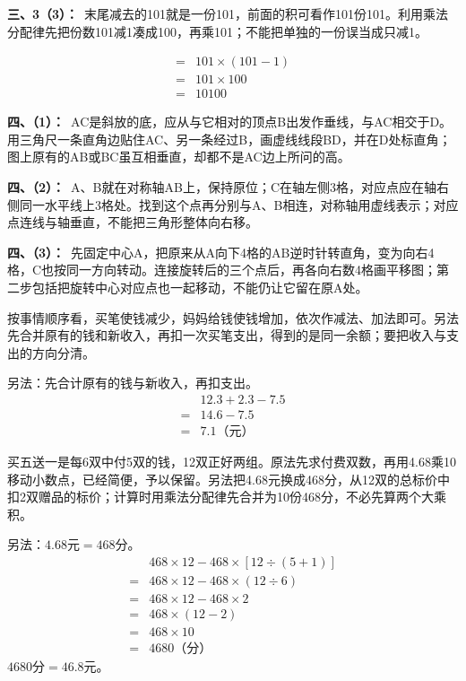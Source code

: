 \documentclass[multi=snippet,border=0pt]{standalone}
\newenvironment{snippet}[3]{\begin{minipage}{#1bp}\color{answerred}\fontsize{#2}{#3}\selectfont\raggedright}{\end{minipage}}
\begin{document}
\begin{snippet}{505}{11.5}{14}\textbf{三、3（3）：}\ 末尾减去的101就是一份101，前面的积可看作101份101。利用乘法分配律先把份数101减1凑成100，再乘101；不能把单独的一份误当成只减1。\end{snippet}
\begin{snippet}{184.567}{10.5}{12.8}\[\begin{aligned}={}&101\times(101-1)\\={}&101\times100\\={}&10100\end{aligned}\]\end{snippet}
\begin{snippet}{505}{11.5}{14}\textbf{四、（1）：}\ AC是斜放的底，应从与它相对的顶点B出发作垂线，与AC相交于D。用三角尺一条直角边贴住AC、另一条经过B，画虚线线段BD，并在D处标直角；图上原有的AB或BC虽互相垂直，却都不是AC边上所问的高。\end{snippet}
\begin{snippet}{505}{11.5}{14}\textbf{四、（2）：}\ A、B就在对称轴AB上，保持原位；C在轴左侧3格，对应点应在轴右侧同一水平线上3格处。找到这个点再分别与A、B相连，对称轴用虚线表示；对应点连线与轴垂直，不能把三角形整体向右移。\end{snippet}
\begin{snippet}{505}{11.5}{14}\textbf{四、（3）：}\ 先固定中心A，把原来从A向下4格的AB逆时针转直角，变为向右4格，C也按同一方向转动。连接旋转后的三个点后，再各向右数4格画平移图；第二步包括把旋转中心对应点也一起移动，不能仍让它留在原A处。\end{snippet}
\begin{snippet}{505}{11.5}{14}按事情顺序看，买笔使钱减少，妈妈给钱使钱增加，依次作减法、加法即可。另法先合并原有的钱和新收入，再扣一次买笔支出，得到的是同一余额；要把收入与支出的方向分清。\par 另法：先合计原有的钱与新收入，再扣支出。\[\begin{aligned} &12.3+2.3-7.5\\={}&14.6-7.5\\={}&7.1\text{（元）}\end{aligned}\]\end{snippet}
\begin{snippet}{505}{11.5}{14}买五送一是每6双中付5双的钱，12双正好两组。原法先求付费双数，再用4.68乘10移动小数点，已经简便，予以保留。另法把4.68元换成468分，从12双的总标价中扣2双赠品的标价；计算时用乘法分配律先合并为10份468分，不必先算两个大乘积。\par 另法：\(4.68\text{元}=468\text{分}\)。\[\begin{aligned}&468\times12-468\times[12\div(5+1)]\\={}&468\times12-468\times(12\div6)\\={}&468\times12-468\times2\\={}&468\times(12-2)\\={}&468\times10\\={}&4680\text{（分）}\end{aligned}\]\(4680\text{分}=46.8\text{元}\)。\end{snippet}
\end{document}
